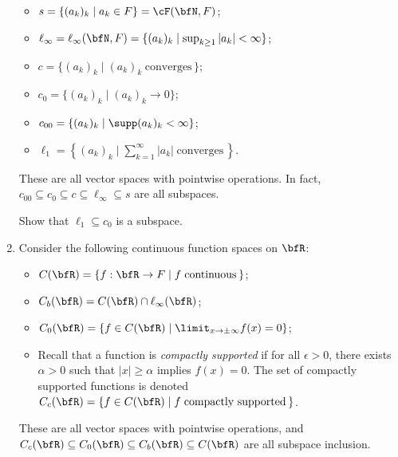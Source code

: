 \begin{example}
\begin{enumerate}[label = (\arabic*),itemsep=1pt,topsep=3pt]
\begin{itemize}
                    \item $s = \{(a_k)_k \mid a_k \in F\} = \cF(\bfN,F)$;
                    \item $\ell_\infty = \ell_\infty(\bfN,F) = \{(a_k)_k \mid \sup_{k \geq 1}|a_k| < \infty\}$;
                    \item $c = \{(a_k)_k \mid (a_k)_k \hspace{3pt}\text{converges}\hspace{2pt}\}$;
                    \item $c_0 = \{(a_k)_k \mid (a_k)_k \rightarrow 0\}$;
                    \item $c_{00} = \{(a_k)_k \mid \supp(a_k)_k < \infty\}$;
                    \item $\ell_1 = \left\{ (a_k)_k \mid \sum_{k = 1}^\infty |a_k| \hspace{3pt}\text{converges}\hspace{2pt} \right\}$.
                \end{itemize}
            These are all vector spaces with pointwise operations. In fact, $c_{00} \subseteq c_0 \subseteq c \subseteq \ell_\infty \subseteq s$ are all subspaces.
                \begin{exercise}
                    Show that $\ell_1 \subseteq c_0$ is a subspace.
                \end{exercise}

            \item Consider the following continuous function spaces on $\bfR$:
                \begin{itemize}
                    \item $C(\bfR) = \{f:\bfR \rightarrow F \mid f \hspace{3pt}\text{continuous}\hspace{2pt}\}$;
                    \item $C_b(\bfR) = C(\bfR) \cap \ell_\infty(\bfR)$;
                    \item $C_0(\bfR) = \{f \in C(\bfR) \mid \limit_{x \rightarrow \pm\infty} f(x) = 0\}$;
                    \item Recall that a function is \textit{compactly supported} if for all $\epsilon > 0$, there exists $\alpha > 0$ such that $|x| \geq \alpha$ implies $f(x) = 0$. The set of compactly supported functions is denoted $C_c(\bfR) = \{f \in C(\bfR) \mid f \hspace{3pt}\text{compactly supported}\hspace{2pt}\}$.
                \end{itemize}
            These are all vector spaces with pointwise operations, and $C_c(\bfR) \subseteq C_0(\bfR) \subseteq C_b(\bfR) \subseteq C(\bfR)$ are all subspace inclusion.
        \end{enumerate}
    \end{example}

